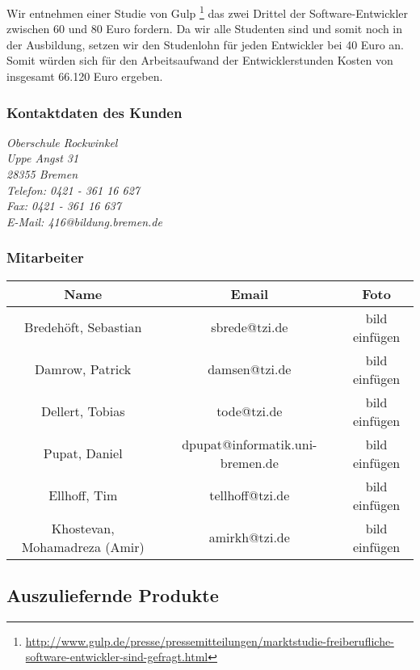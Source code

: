 \documentclass[fontsize=12pt,paper=a4,twoside]{scrartcl}
\begin{document}
Wir entnehmen einer Studie von Gulp \footnote{\url{http://www.gulp.de/presse/pressemitteilungen/marktstudie-freiberufliche-software-entwickler-sind-gefragt.html}} das zwei Drittel der Software-Entwickler zwischen 60 und 80 Euro fordern. Da wir alle Studenten sind und somit noch in der Ausbildung, setzen wir den Studenlohn für jeden Entwickler bei 40 Euro an. Somit würden sich für den Arbeitsaufwand der Entwicklerstunden Kosten von insgesamt 66.120 Euro ergeben.

\subsubsection{Kontaktdaten des Kunden}

{\em Oberschule Rockwinkel\\
	Uppe Angst 31 \\
	28355 Bremen \\
	Telefon: 0421 - 361 16 627 \\
	Fax: 0421 - 361 16 637 \\
	E-Mail: 416@bildung.bremen.de\\}

\subsubsection{Mitarbeiter}

\begin{table}[htbp]
\begin{tabular}{|c|c|c|}
\hline 
Name & Email & Foto\\ \hline
Bredehöft, Sebastian & sbrede@tzi.de & bild einfügen \\ \hline
Damrow, Patrick & damsen@tzi.de & bild einfügen\\ \hline
Dellert, Tobias & tode@tzi.de & bild einfügen\\\hline
Pupat, Daniel & dpupat@informatik.uni-bremen.de & bild einfügen \\ \hline
Ellhoff, Tim & tellhoff@tzi.de & bild einfügen\\ \hline
Khostevan, Mohamadreza (Amir) & amirkh@tzi.de & bild einfügen \\ \hline
\end{tabular}
\end{table}

\subsection{Auszuliefernde Produkte}
\end{document}
